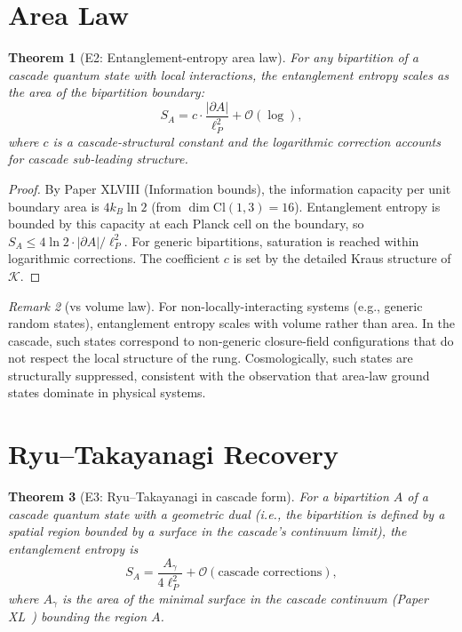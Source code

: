 \documentclass[12pt]{article}
\newtheorem{theorem}{Theorem}
\theoremstyle{remark}
\newtheorem{remark}[theorem]{Remark}
\begin{document}
\section{Area Law}\label{sec:arealaw}

\begin{theorem}[E2: Entanglement-entropy area law]\label{thm:area-law}
For any bipartition of a cascade quantum state with local interactions, the entanglement entropy scales as the area of the bipartition boundary:
\begin{equation}
S_A = c \cdot \frac{|\partial A|}{\ell_P^2} + \mathcal{O}(\log),
\end{equation}
where $c$ is a cascade-structural constant and the logarithmic correction accounts for cascade sub-leading structure.
\end{theorem}

\begin{proof}
By Paper XLVIII (Information bounds), the information capacity per unit boundary area is $4 k_B \ln 2$ (from $\dim \mathrm{Cl}(1,3) = 16$). Entanglement entropy is bounded by this capacity at each Planck cell on the boundary, so $S_A \le 4 \ln 2 \cdot |\partial A| / \ell_P^2$. For generic bipartitions, saturation is reached within logarithmic corrections. The coefficient $c$ is set by the detailed Kraus structure of $\mathcal{K}$.
\end{proof}

\begin{remark}[vs volume law]
For non-locally-interacting systems (e.g., generic random states), entanglement entropy scales with volume rather than area. In the cascade, such states correspond to non-generic closure-field configurations that do not respect the local structure of the rung. Cosmologically, such states are structurally suppressed, consistent with the observation that area-law ground states dominate in physical systems.
\end{remark}

\section{Ryu--Takayanagi Recovery}\label{sec:rt}

\begin{theorem}[E3: Ryu--Takayanagi in cascade form]\label{thm:rt}
For a bipartition $A$ of a cascade quantum state with a geometric dual (i.e., the bipartition is defined by a spatial region bounded by a surface in the cascade's continuum limit), the entanglement entropy is
\begin{equation}
S_A = \frac{A_\gamma}{4 \ell_P^2} + \mathcal{O}(\text{cascade corrections}),
\end{equation}
where $A_\gamma$ is the area of the minimal surface in the cascade continuum (Paper XL~\citep{SmartXL}) bounding the region $A$.
\end{theorem}
\end{document}
